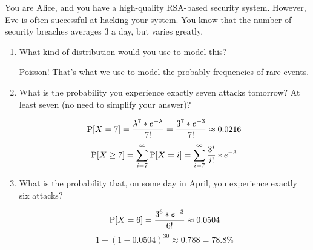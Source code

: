 \question You are Alice, and you have a high-quality RSA-based security 
system. However, Eve is often successful at hacking your system. You 
know that the number of security breaches averages 3 a day, but varies greatly.

\begin{enumerate}[label=(\alph*)]
\item What kind of distribution would you use to model this?
\begin{solution}[2cm]
Poisson! That's what we use to model the probably frequencies of rare 
events.
\end{solution}

\item What is the probability you experience exactly seven attacks 
tomorrow? At least seven (no need to simplify your answer)?
\begin{solution}[2cm]
\[\P[X=7] = \frac{\lambda^7 * e^{-\lambda}}{7!} = \frac{3^7 * 
e^{-3}}{7!} \approx 0.0216\]
\[\P[X \geq 7] = \sum_{i=7}^{\infty}\P[X = i] = \sum_{i = 7}^{\infty} 
\frac{3^i}{i!} * e^{-3} \]
\end{solution}

\item What is the probability that, on some day in April, you experience 
exactly six attacks?
\begin{solution}[2cm]
\[\P[X=6] = \frac{3^6 * e^{-3}}{6!} \approx 0.0504 \]
\[1 - (1 - 0.0504)^{30} \approx 0.788 = 78.8\%\]
\end{solution}
\end{enumerate}